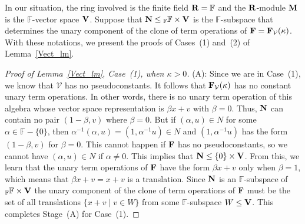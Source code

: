 \documentclass[12pt]{amsart}
\theoremstyle{definition}
\numberwithin{equation}{section}
\newcommand{\m}[1]{{\mathbf{\uppercase{#1}}}}
\begin{document}
In our situation, the ring involved is the
finite field $\m r = \mathbb{F}$
and the $\m r$-module $\m m$ is the $\mathbb{F}$-vector space
$\m v$. Suppose that $\m n\leq {}_{\mathbb{F}}\mathbb{F}\times \m v$
is the
$\mathbb{F}$-subspace
that determines the unary component of the
clone of term operations of $\m f=\m f_{\mathcal{V}}(\kappa)$.
With these notations, we present the proofs of
Cases~(1) and~(2) of Lemma~\ref{Vect_lm}.

\begin{proof}[Proof of Lemma~\ref{Vect_lm}, Case~(1), when $\kappa>0$]   
(A): Since we are in Case~(1), we know that
$\mathcal{V}$ has no pseudoconstants.
It follows that $\m f_{\mathcal{V}}(\kappa)$
has no constant unary term operations.
In other words, there is no unary term operation
of this algebra whose vector space representation is
$\beta x+v$ with $\beta=0$.
Thus, $\m n$ can contain no pair
$(1-\beta,v)$ where $\beta=0$.
But if $(\alpha,u)\in N$ for some $\alpha\in \mathbb{F}-\{0\}$,
then $\alpha^{-1}(\alpha,u)=(1,\alpha^{-1}u)\in N$ and
$(1,\alpha^{-1}u)$ has the form $(1-\beta,v)$
for $\beta=0$. This cannot happen
if $\m f$ has no pseudoconstants,
so we cannot have $(\alpha,u)\in N$ if $\alpha\neq 0$.
This implies that 
$\m n\leq \{0\}\times \m v$. From this, we learn that the
unary term operations of $\m f$
have the form $\beta x+v$ only when $\beta=1$,
which means that $\beta x+v=x+v$ is a translation.
Since $\m n$ is an $\mathbb{F}$-subspace
of ${}_{\mathbb{F}}\mathbb{F}\times \m v$
the unary component of the clone of term
operations of $\m f$ must be the set of all translations 
$\{x+v\;|\;v\in W\}$
from some $\mathbb{F}$-subspace $W\leq \m V$.
This completes Stage~(A) for Case~(1).


\end{proof}
\end{document}
